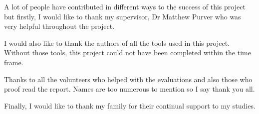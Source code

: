 
\cleardoublepage


\begin{acknowledgements}
A lot of people have contributed in different ways to the success of this project but firstly, I
would like to thank my supervisor, Dr Matthew Purver who was very helpful throughout the project.

I would also like to thank the authors of all the tools used in this project. Without those
tools, this project could not have been completed within the time frame.

Thanks to all the volunteers who helped with the evaluations and also those who proof read the report.
Names are too numerous to mention so I say thank you all.

Finally, I would like to thank my family for their continual support to my studies. 
\end{acknowledgements}
